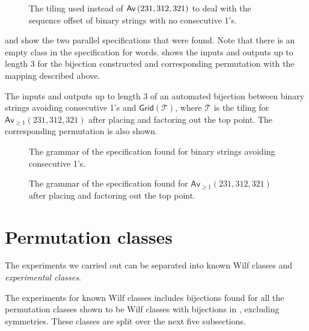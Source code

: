 \begin{figure}[!htbp]
    \centering
    
    \caption{The tiling used instead of $\textsf{Av}\left(231,312,321\right)$ to deal with the sequence offset of binary strings with no consecutive 1's.}
    \label{fig:fibpermoffbyone}
\end{figure}

 and  show the two parallel specifications that were found. Note that there is an empty class in the specification for words.  shows the inputs and outputs up to length $3$ for the bijection constructed and corresponding permutation with the mapping described above. 

\begin{table}[ht!]
    \centering
    
    \caption{The inputs and outputs up to length $3$ of an automated bijection between binary strings avoiding consecutive 1's and $\textsf{Grid}(\mathcal{T})$, where $\mathcal{T}$ is the tiling for $\textsf{Av}_{\geq1}(231,312,321)$ after placing and factoring out the top point. The corresponding permutation is also shown.}
    \label{tab:wordtilmap}
\end{table}

\begin{figure}
    \centering
    
    \vspace*{-12.5mm}
    \caption{The grammar of the specification found for binary strings avoiding consecutive 1's.}
    \label{fig:fibwordtree}
\end{figure}
\begin{figure}
    \centering
    
    \vspace*{-14mm}
    \caption{The grammar of the specification found for $\textsf{Av}_{\geq1}(231,312,321)$ after placing and factoring out the top point.}
    \label{fig:fibpermtree}
\end{figure}

\section{Permutation classes}
The experiments we carried out can be separated into known Wilf classes and \emph{experimental classes}.

The experiments for known Wilf classes includes bijections found for all the permutation classes shown to be Wilf classes with bijections in , excluding symmetries. These classes are split over the next five subsections.

